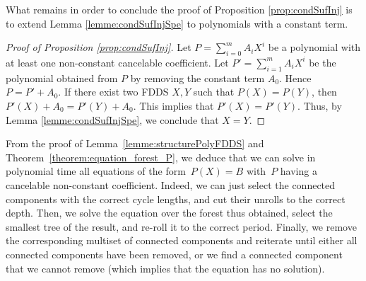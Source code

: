 	What remains in order to conclude the proof of Proposition \ref{prop:condSufInj} is to extend Lemma \ref{lemme:condSufInjSpe} to polynomials with a constant term.
	
	\begin{proof}[Proof of Proposition \ref{prop:condSufInj}]
		Let $P = \sum_{i=0}^{m} A_i X^{i}$ be a polynomial with at least one non-constant cancelable coefficient.
		Let $P' = \sum_{i=1}^{m} A_i X^{i}$ be the polynomial obtained from $P$ by removing the constant term $A_0$.
		Hence $P = P' + A_0$.
		If there exist two FDDS $X,Y$ such that $P(X) = P(Y)$, then $P'(X) + A_0 = P'(Y) + A_0$.
		This implies that $P'(X) = P'(Y)$.
		Thus, by Lemma \ref{lemme:condSufInjSpe}, we conclude that $X = Y$. 
	\end{proof}
	
	From the proof of Lemma~\ref{lemme:structurePolyFDDS} and Theorem~\ref{theorem:equation_forest_P}, we deduce that we can solve in polynomial time all equations of the form~$P(X) = B$ with~$P$ having a cancelable non-constant coefficient. 
	Indeed, we can just select the connected components with the correct cycle lengths, and cut their unrolls to the correct depth. 
	Then, we solve the equation over the forest thus obtained, select the smallest tree of the result, and re-roll it to the correct period. 
	Finally, we remove the corresponding multiset of connected components and reiterate until either all connected components have been removed, or we find a connected component that we cannot remove (which implies that the equation has no solution). 
	
